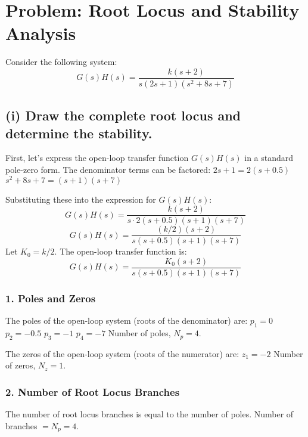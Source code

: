 \documentclass{article}
\begin{document}
	
	\section*{Problem: Root Locus and Stability Analysis}
	
	Consider the following system:
	$$ G(s)H(s) = \frac{k(s+2)}{s(2s+1)(s^2+8s+7)} $$
	
	\subsection*{(i) Draw the complete root locus and determine the stability.}
	
	First, let's express the open-loop transfer function $G(s)H(s)$ in a standard pole-zero form.
	The denominator terms can be factored:
	$2s+1 = 2(s+0.5)$
	$s^2+8s+7 = (s+1)(s+7)$
	
	Substituting these into the expression for $G(s)H(s)$:
	$$ G(s)H(s) = \frac{k(s+2)}{s \cdot 2(s+0.5)(s+1)(s+7)} $$
	$$ G(s)H(s) = \frac{(k/2)(s+2)}{s(s+0.5)(s+1)(s+7)} $$
	Let $K_0 = k/2$. The open-loop transfer function is:
	$$ G(s)H(s) = \frac{K_0(s+2)}{s(s+0.5)(s+1)(s+7)} $$
	
	\subsubsection*{1. Poles and Zeros}
	The poles of the open-loop system (roots of the denominator) are:
	$p_1 = 0$
	$p_2 = -0.5$
	$p_3 = -1$
	$p_4 = -7$
	Number of poles, $N_p = 4$.
	
	The zeros of the open-loop system (roots of the numerator) are:
	$z_1 = -2$
	Number of zeros, $N_z = 1$.
	
	\subsubsection*{2. Number of Root Locus Branches}
	The number of root locus branches is equal to the number of poles.
	Number of branches $= N_p = 4$.
	
\end{document}
